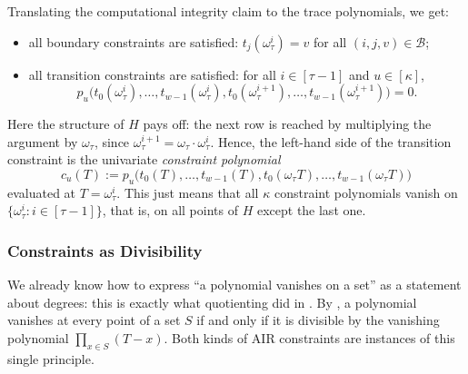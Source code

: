 \documentclass[../../book]{subfiles}
\begin{document}
Translating the computational integrity claim to the trace polynomials, we get:
\begin{itemize}
  \item all boundary constraints are satisfied: $t_j(\omega_\tau^i) = v$ for all $(i, j, v) \in \mathcal{B}$;
  \item all transition constraints are satisfied: for all $i \in [\tau - 1]$ and $u \in [\kappa]$,
  \begin{equation*}
    p_u\big(t_0(\omega_\tau^i), \ldots, t_{w-1}(\omega_\tau^i), t_0(\omega_\tau^{i+1}), \ldots, t_{w-1}(\omega_\tau^{i+1})\big) = 0.
  \end{equation*}
\end{itemize}
Here the structure of $H$ pays off: the next row is reached by multiplying the argument by $\omega_\tau$, since $\omega_\tau^{i+1} = \omega_\tau \cdot \omega_\tau^i$.
Hence, the left-hand side of the transition constraint is the univariate \emph{constraint polynomial}
\begin{equation*}
  c_u(T) := p_u\big(t_0(T), \ldots, t_{w-1}(T), t_0(\omega_\tau T), \ldots, t_{w-1}(\omega_\tau T)\big)
\end{equation*}
evaluated at $T = \omega_\tau^i$.
This just means that all $\kappa$ constraint polynomials vanish on $\{\omega_\tau^i : i \in [\tau - 1]\}$, that is, on all points of $H$ except the last one.

\subsubsection{Constraints as Divisibility}

We already know how to express ``a polynomial vanishes on a set'' as a statement about degrees: this is exactly what quotienting did in .
By , a polynomial vanishes at every point of a set $S$ if and only if it is divisible by the vanishing polynomial $\prod_{x \in S}(T - x)$.
Both kinds of AIR constraints are instances of this single principle.
\end{document}
